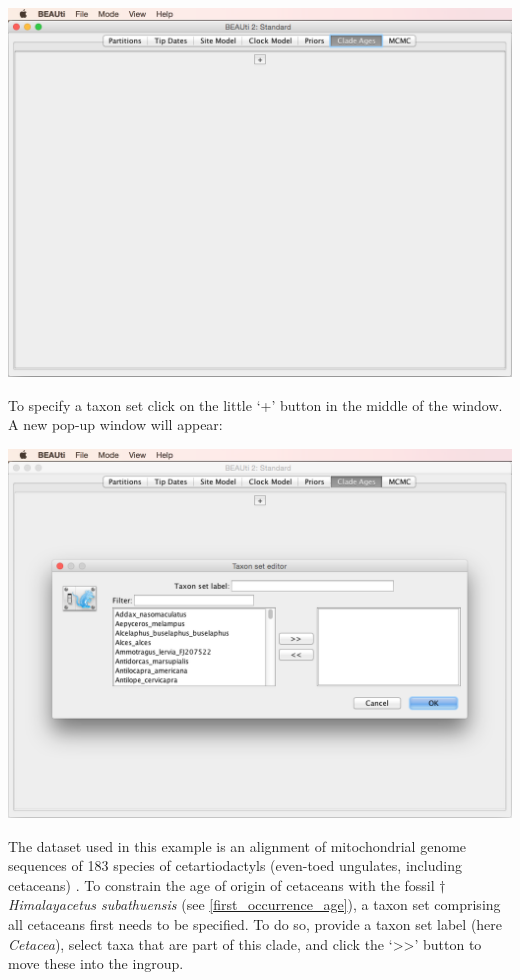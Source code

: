 \documentclass{article}
\begin{document}
\begin{center}\includegraphics[width=\textwidth]{fig5.png}\end{center}

\newpage
\noindent
To specify a taxon set click on the little `+' button in the middle of the window. A new pop-up window will appear:

\begin{center}\includegraphics[width=\textwidth]{fig6.png}\end{center}

\noindent
The dataset used in this example is an alignment of mitochondrial genome sequences of 183 species of cetartiodactyls (even-toed ungulates, including ceta\-ce\-ans) \citep{Hassanin:2012il}. To constrain the age of origin of cetaceans with the fossil $\dagger$\textit{Himalayacetus subathuensis} (see \ref{first_occurrence_age}), a taxon set comprising all cetaceans first needs to be specified. To do so, provide a taxon set label (here \emph{Cetacea}), select taxa that are part of this clade, and click the `\textgreater\textgreater' button to move these into the ingroup.
\end{document}
